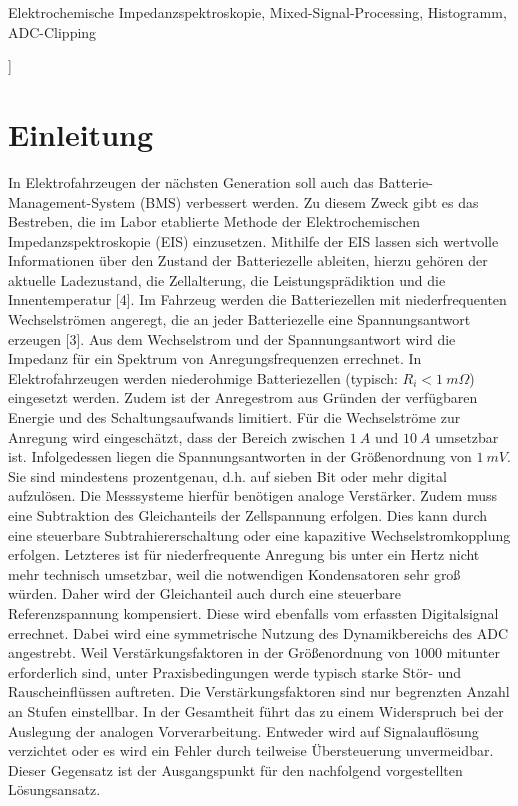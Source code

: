 	\vspace{.5em}
	\begin{IEEEkeywords}
		\fontsize{10pt}{12pt}\selectfont
		\normalfont Elektrochemische Impedanzspektroskopie, Mixed-Signal-Processing, Histogramm, ADC-Clipping
	\end{IEEEkeywords} 
	\vspace{3em}
	] 
\graphicspath{{./BILDER}}
\section{Einleitung}	

In Elektrofahrzeugen der nächsten Generation soll auch das Batterie-Management-System (BMS) verbessert werden. Zu diesem Zweck gibt es das Bestreben, die im Labor etablierte Methode der Elektrochemischen Impedanzspektroskopie (EIS) einzusetzen. Mithilfe der EIS lassen sich wertvolle Informationen über den Zustand der Batteriezelle ableiten, hierzu gehören der aktuelle Ladezustand, die Zellalterung, die Leistungsprädiktion und die Innentemperatur [4]. Im Fahrzeug werden die Batteriezellen mit niederfrequenten Wechselströmen angeregt, die an jeder Batteriezelle eine Spannungsantwort erzeugen [3]. Aus dem Wechselstrom und der Spannungsantwort wird die Impedanz für ein Spektrum von Anregungsfrequenzen errechnet. In Elektrofahrzeugen werden niederohmige Batteriezellen (typisch: $R_i < \SI{1}{m\Omega}$) eingesetzt werden. Zudem ist der Anregestrom aus Gründen der verfügbaren Energie und des Schaltungsaufwands limitiert. Für die Wechselströme zur Anregung wird eingeschätzt, dass der Bereich zwischen $\SI{1}{A}$ und $\SI{10}{A}$ umsetzbar ist. Infolgedessen liegen die Spannungsantworten in der Größenordnung  von $\SI{1}{mV}$. Sie sind mindestens prozentgenau, d.h. auf sieben Bit oder mehr digital aufzulösen. Die Messsysteme hierfür benötigen analoge Verstärker. Zudem muss eine Subtraktion des Gleichanteils der Zellspannung erfolgen. Dies kann durch eine steuerbare Subtrahiererschaltung oder eine kapazitive Wechselstromkopplung erfolgen. Letzteres ist für niederfrequente Anregung bis unter ein Hertz nicht mehr technisch umsetzbar, weil die notwendigen Kondensatoren sehr groß würden. Daher wird der Gleichanteil auch durch eine steuerbare Referenzspannung kompensiert. Diese wird ebenfalls vom erfassten Digitalsignal errechnet. Dabei wird eine symmetrische Nutzung des Dynamikbereichs des ADC angestrebt. 
Weil Verstärkungsfaktoren in der Größenordnung von $1000$ mitunter erforderlich sind, unter Praxisbedingungen werde typisch starke Stör- und Rauscheinflüssen auftreten. Die Verstärkungsfaktoren sind nur begrenzten Anzahl an Stufen einstellbar. In der Gesamtheit führt das zu einem Widerspruch bei der Auslegung der analogen Vorverarbeitung. Entweder wird auf Signalauflösung verzichtet oder es wird ein Fehler durch teilweise Übersteuerung unvermeidbar. Dieser Gegensatz ist der Ausgangspunkt für den nachfolgend vorgestellten Lösungsansatz.

